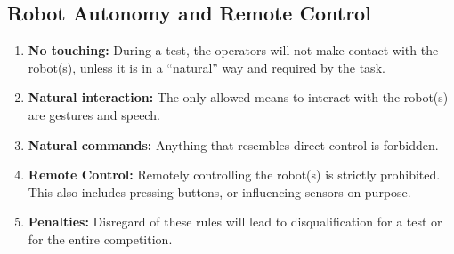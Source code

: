 \subsection{Robot Autonomy and Remote Control}
\begin{enumerate}
	\item \textbf{No touching:} During a test, the operators will not make contact with the robot(s), unless it is in a \enquote{natural} way and required by the task.

	\item \textbf{Natural interaction:} The only allowed means to interact with the robot(s) are gestures and speech.

	\item \textbf{Natural commands:} Anything that resembles direct control is forbidden.

	\item \textbf{Remote Control:} Remotely controlling the robot(s) is strictly prohibited.
	This also includes pressing buttons, or influencing sensors on purpose.

	\item \textbf{Penalties:} Disregard of these rules will lead to disqualification for a test or for the entire competition.
\end{enumerate}



